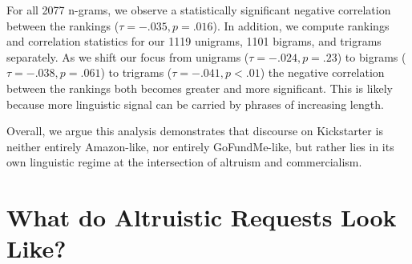\documentclass[letterpaper]{article}
\begin{document}
For all 2077 n-grams, we observe a statistically significant negative correlation between the rankings ($\tau = -.035, p = .016$). In addition, we compute rankings and correlation statistics for our 1119 unigrams, 1101 bigrams, and trigrams separately. As we shift our focus from unigrams ($\tau = -.024, p = .23$) to bigrams ($\tau = -.038, p = .061$) to trigrams ($\tau = -.041, p < .01$) the negative correlation between the rankings both becomes greater and more significant. This is likely because more linguistic signal can be carried by phrases of increasing length.

Overall, we argue this analysis demonstrates that discourse on Kickstarter is neither entirely Amazon-like, nor entirely GoFundMe-like, but rather lies in its own linguistic regime at the intersection of altruism and commercialism.
\section{What do Altruistic Requests Look Like?}
\end{document}
